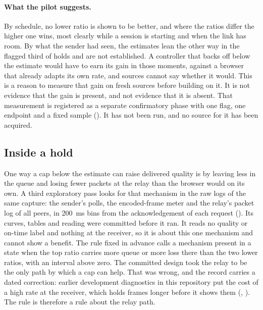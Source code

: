 \paragraph{What the pilot suggests.}
By schedule, no lower ratio is shown to be better, and where the ratios differ the higher one wins, most clearly while a session is starting and when the link has room. By what the sender had seen, the estimates lean the other way in the flagged third of holds and are not established. A controller that backs off below the estimate would have to earn its gain in those moments, against a browser that already adapts its own rate, and \NOneSources{} sources cannot say whether it would. This is a reason to measure that gain on fresh sources before building on it. It is not evidence that the gain is present, and not evidence that it is absent. That measurement is registered as a separate confirmatory phase with one flag, one endpoint and a fixed sample (). It has not been run, and no source for it has been acquired.
\fi

\ifdefined\NOneDynPeers
\subsection{Inside a hold}
\label{sec:n1-dynamics}
One way a cap below the estimate can raise delivered quality is by leaving less in the queue and losing fewer packets at the relay than the browser would on its own. A third exploratory pass looks for that mechanism in the raw logs of the same capture: the sender's polls, the encoded-frame meter and the relay's packet log of all \NOneDynPeers{} peers, in 200~ms bins from the acknowledgement of each request (). Its curves, tables and reading were committed before it ran. It reads no quality or on-time label and nothing at the receiver, so it is about this one mechanism and cannot show a benefit. The rule fixed in advance calls a mechanism present in a state when the top ratio carries more queue or more loss there than the two lower ratios, with an interval above zero. The committed design took the relay to be the only path by which a cap can help. That was wrong, and the record carries a dated correction: earlier development diagnostics in this repository put the cost of a high rate at the receiver, which holds frames longer before it shows them (, ). The rule is therefore a rule about the relay path.

